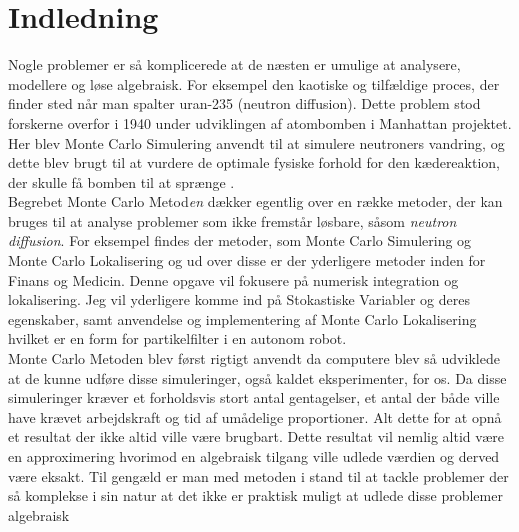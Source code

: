 \documentclass[../../SRP.tex]{subfiles}
\begin{document}
\chapter{Indledning}

Nogle problemer er så komplicerede at de næsten er umulige at analysere, modellere og løse algebraisk. For eksempel den kaotiske og tilfældige proces, der finder sted når man spalter uran-235 (neutron diffusion). Dette problem stod forskerne overfor i 1940 under udviklingen af atombomben i Manhattan projektet. Her blev Monte Carlo Simulering anvendt til at simulere neutroners vandring, og dette blev brugt til at vurdere de optimale fysiske forhold for den kædereaktion, der skulle få bomben til at sprænge \cite{AHF}. \\

Begrebet Monte Carlo Metod\textit{en} dækker egentlig over en række metoder, der kan bruges til at analyse problemer som ikke fremstår løsbare, såsom \textit{neutron diffusion}. For eksempel findes der metoder, som Monte Carlo Simulering og Monte Carlo Lokalisering og ud over disse er der yderligere metoder inden for Finans og Medicin. Denne opgave vil fokusere på numerisk integration og lokalisering. Jeg vil yderligere komme ind på Stokastiske Variabler og deres egenskaber, samt anvendelse og implementering af Monte Carlo Lokalisering hvilket er en form for partikelfilter i en autonom robot. \\

Monte Carlo Metoden blev først rigtigt anvendt da computere blev så udviklede at de kunne udføre disse simuleringer, også kaldet eksperimenter, for os. Da disse simuleringer kræver et forholdsvis stort antal gentagelser, et antal der både ville have krævet arbejdskraft og tid af umådelige proportioner. Alt dette for at opnå et resultat der ikke altid ville være brugbart. Dette resultat vil nemlig altid være en approximering hvorimod en algebraisk tilgang ville udlede værdien og derved være eksakt. Til gengæld er man med metoden i stand til at tackle problemer der så komplekse i sin natur at det ikke er praktisk muligt at udlede disse problemer algebraisk \cite{SBM} \\
\end{document}
